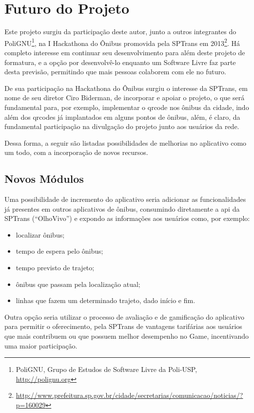 \section{Futuro do Projeto}\label{sec:futuro}
Este projeto surgiu da participação deste autor, junto a outros integrantes do PoliGNU\footnote{PoliGNU, Grupo de Estudos de Software Livre da Poli-USP, \url{http://polignu.org}}, na I Hackathona do Ônibus promovida pela SPTrans em 2013\footnote{\url{http://www.prefeitura.sp.gov.br/cidade/secretarias/comunicacao/noticias/?p=160029}}. Há completo interesse em continuar seu desenvolvimento para além deste projeto de formatura, e a opção por desenvolvê-lo enquanto um Software Livre faz parte desta previsão, permitindo que mais pessoas colaborem com ele no futuro.

De sua participação na Hackathona do Ônibus surgiu o interesse da SPTrans, em nome de seu diretor Ciro Biderman, de incorporar e apoiar o projeto, o que será fundamental para, por exemplo, implementar o \gls{qrcode} nos ônibus da cidade, indo além dos \gls{qrcode}s já implantados em alguns pontos de ônibus, além, é claro, da fundamental participação na divulgação do projeto junto aos usuários da rede.

Dessa forma, a seguir são listadas possibilidades de melhorias no aplicativo como um todo, com a incorporação de novos recursos.
\subsection{Novos Módulos}\label{subsec:futuro-novos-mod}
Uma possibilidade de incremento do aplicativo seria adicionar as funcionalidades já presentes em outros aplicativos de ônibus, consumindo diretamente a \gls{api} da SPTrans (``OlhoVivo'') e expondo as informações aos usuários como, por exemplo:
\begin{itemize}
    \item localizar ônibus;
    \item tempo de espera pelo ônibus;
    \item tempo previsto de trajeto;
    \item ônibus que passam pela localização atual;
    \item linhas que fazem um determinado trajeto, dado início e fim.
\end{itemize}

Outra opção seria utilizar o processo de avaliação e de gamificação do aplicativo para permitir o oferecimento, pela SPTrans de vantagens tarifárias aos usuários que mais contribuem ou que possuem melhor desempenho no Game, incentivando uma maior participação.

